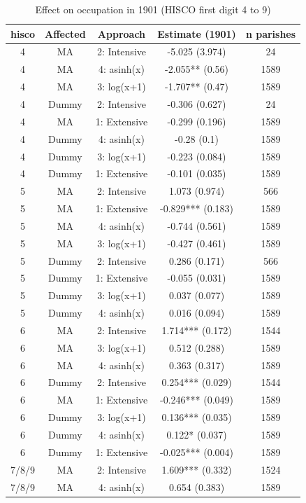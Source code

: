 \begin{table}[]
    \centering
    \caption{\label{tab:occ2} Effect on occupation in 1901 (HISCO first digit 4 to 9)}
    \footnotesize
    \begin{tabular}{ccccc}
\toprule
hisco & Affected & Approach & Estimate (1901) & n parishes\\
\midrule
4 & MA & 2: Intensive & -5.025 (3.974) & 24\\
4 & MA & 4: asinh(x) & -2.055** (0.56) & 1589\\
4 & MA & 3: log(x+1) & -1.707** (0.47) & 1589\\
4 & Dummy & 2: Intensive & -0.306 (0.627) & 24\\
4 & MA & 1: Extensive & -0.299 (0.196) & 1589\\
4 & Dummy & 4: asinh(x) & -0.28 (0.1) & 1589\\
4 & Dummy & 3: log(x+1) & -0.223 (0.084) & 1589\\
4 & Dummy & 1: Extensive & -0.101 (0.035) & 1589\\
5 & MA & 2: Intensive & 1.073 (0.974) & 566\\
5 & MA & 1: Extensive & -0.829*** (0.183) & 1589\\
5 & MA & 4: asinh(x) & -0.744 (0.561) & 1589\\
5 & MA & 3: log(x+1) & -0.427 (0.461) & 1589\\
5 & Dummy & 2: Intensive & 0.286 (0.171) & 566\\
5 & Dummy & 1: Extensive & -0.055 (0.031) & 1589\\
5 & Dummy & 3: log(x+1) & 0.037 (0.077) & 1589\\
5 & Dummy & 4: asinh(x) & 0.016 (0.094) & 1589\\
6 & MA & 2: Intensive & 1.714*** (0.172) & 1544\\
6 & MA & 3: log(x+1) & 0.512 (0.288) & 1589\\
6 & MA & 4: asinh(x) & 0.363 (0.317) & 1589\\
6 & Dummy & 2: Intensive & 0.254*** (0.029) & 1544\\
6 & MA & 1: Extensive & -0.246*** (0.049) & 1589\\
6 & Dummy & 3: log(x+1) & 0.136*** (0.035) & 1589\\
6 & Dummy & 4: asinh(x) & 0.122* (0.037) & 1589\\
6 & Dummy & 1: Extensive & -0.025*** (0.004) & 1589\\
7/8/9 & MA & 2: Intensive & 1.609*** (0.332) & 1524\\
7/8/9 & MA & 4: asinh(x) & 0.654 (0.383) & 1589\\

\end{tabular}
\end{table}
